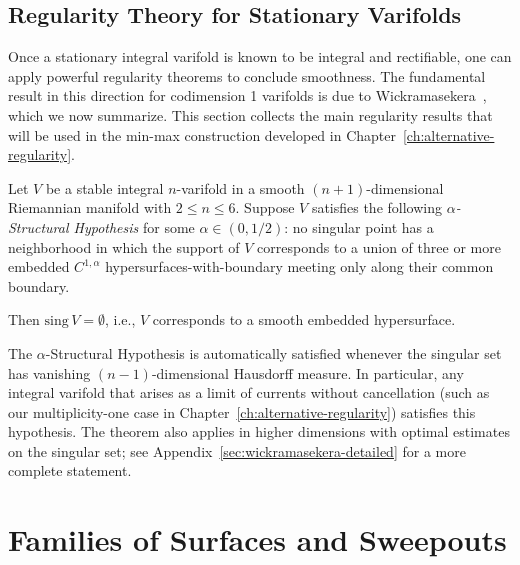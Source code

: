 \section{Regularity Theory for Stationary Varifolds}\label{sec:regularity-theory}
Once a stationary integral varifold is known to be integral and rectifiable, one can apply powerful regularity theorems to conclude smoothness. The fundamental result in this direction for codimension 1 varifolds is due to Wickramasekera~\cite{Wic14}, which we now summarize. This section collects the main regularity results that will be used in the min-max construction developed in Chapter~\ref{ch:alternative-regularity}.

\begin{theorem}\label{thm:wickramasekera-prelim}
Let $V$ be a stable integral $n$-varifold in a smooth $(n+1)$-dimensional Riemannian manifold with
$2 \leq n \leq 6$. Suppose $V$ satisfies the following \emph{$\alpha$-Structural Hypothesis} for
some $\alpha \in (0,1/2)$: no singular point has a neighborhood in which the support of $V$
corresponds to a union of three or more embedded $C^{1,\alpha}$ hypersurfaces-with-boundary meeting
only along their common boundary.

Then $\mathrm{sing}\, V = \emptyset$, i.e., $V$ corresponds to a smooth embedded hypersurface.
\end{theorem}
The $\alpha$-Structural Hypothesis is automatically satisfied whenever the singular set has vanishing
$(n-1)$-dimensional Hausdorff measure. In particular, any integral varifold that arises as a limit
of currents without cancellation (such as our multiplicity-one case in Chapter~\ref{ch:alternative-regularity})
satisfies this hypothesis. The theorem also applies in higher dimensions with optimal estimates on
the singular set; see Appendix~\ref{sec:wickramasekera-detailed} for a more complete statement.

\chapter{Families of Surfaces and Sweepouts}\label{ch:sweepouts}

